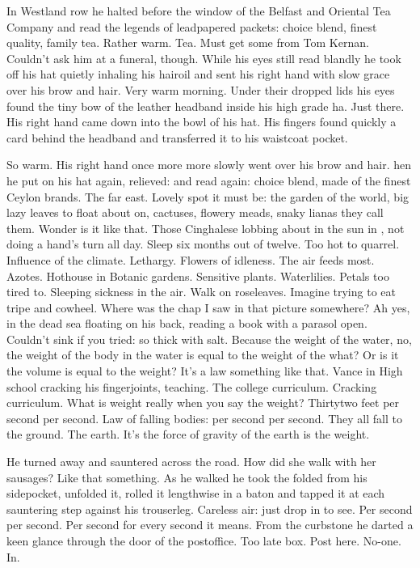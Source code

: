 In Westland row
he halted before the window of the Belfast and Oriental Tea Company
and read the legends of leadpapered packets:
choice blend, finest quality, family tea.
Rather warm.
Tea.
Must get some from Tom Kernan.
Couldn't ask him at a funeral, though.
While his eyes still read blandly
he took off his hat
quietly inhaling his hairoil
and sent his right hand with slow grace over his brow and hair.
Very warm morning.
Under their dropped lids
his eyes found the tiny bow of the leather headband inside his high grade ha.
Just there.
His right hand came down into the bowl of his hat.
His fingers found quickly a card behind the headband
and transferred it to his waistcoat pocket.

So warm.
His right hand once more more slowly went over his brow and hair. 
hen he put on his hat again, relieved:
and read again:
choice blend, made of the finest Ceylon brands.
The far east.
Lovely spot it must be:
the garden of the world,
big lazy leaves to float about on,
cactuses, flowery meads,
snaky lianas they call them.
Wonder is it like that.
Those Cinghalese lobbing about in the sun in ,
not doing a hand's turn all day.
Sleep six months out of twelve.
Too hot to quarrel.
Influence of the climate.
Lethargy.
Flowers of idleness.
The air feeds most.
Azotes.
Hothouse in Botanic gardens.
Sensitive plants.
Waterlilies.
Petals too tired to.
Sleeping sickness in the air.
Walk on roseleaves.
Imagine trying to eat tripe and cowheel.
Where was the chap I saw in that picture somewhere?
Ah yes, in the dead sea floating on his back,
reading a book with a parasol open.
Couldn't sink if you tried:
so thick with salt.
Because the weight of the water,
no, the weight of the
body in the water
is equal to the weight of the what?
Or is it the volume
is equal to the weight?
It's a law something like that.
Vance in High school cracking his fingerjoints, teaching.
The college curriculum.
Cracking curriculum.
What is weight really when you say the weight?
Thirtytwo feet per second per second.
Law of falling bodies:
per second per second.
They all fall to the ground.
The earth.
It's the force of gravity of the earth
is the weight.

He turned away and sauntered across the road.
How did she walk with her sausages?
Like that something.
As he walked he took the folded  from his sidepocket,
unfolded it, rolled it lengthwise in a baton
and tapped it at each sauntering step against his trouserleg.
Careless air: just drop in to see.
Per second per second.
Per second for every second
it means.
From the curbstone
he darted a keen glance through the door of the postoffice.
Too late box.
Post here.
No-one.
In.

